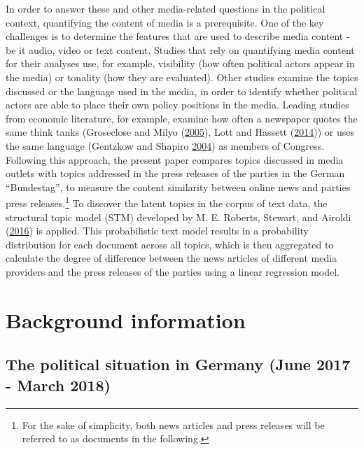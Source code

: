 \documentclass[
]{article}
\begin{document}
In order to answer these and other media-related questions in the
political context, quantifying the content of media is a prerequisite.
One of the key challenges is to determine the features that are used to
describe media content - be it audio, video or text content. Studies
that rely on quantifying media content for their analyses use, for
example, visibility (how often political actors appear in the media) or
tonality (how they are evaluated). Other studies examine the topics
discussed or the language used in the media, in order to identify
whether political actors are able to place their own policy positions in
the media. Leading studies from economic literature, for example,
examine how often a newspaper quotes the same think tanks (Groseclose
and Milyo (\protect\hyperlink{ref-groseclose_measure_2005}{2005}), Lott
and Hassett (\protect\hyperlink{ref-lott_is_2014}{2014})) or uses the
same language (Gentzkow and Shapiro
\protect\hyperlink{ref-gentzkow_media_2004}{2004}) as members of
Congress. Following this approach, the present paper compares topics
discussed in media outlets with topics addressed in the press releases
of the parties in the German ``Bundestag'', to measure the content
similarity between online news and parties press releases.\footnote{For
  the sake of simplicity, both news articles and press releases will be
  referred to as documents in the following.} To discover the latent
topics in the corpus of text data, the structural topic model (STM)
developed by M. E. Roberts, Stewart, and Airoldi
(\protect\hyperlink{ref-roberts_model_2016}{2016}) is applied. This
probabilistic text model results in a probability distribution for each
document across all topics, which is then aggregated to calculate the
degree of difference between the news articles of different media
providers and the press releases of the parties using a linear
regression model.

\hypertarget{background-information}{%
\section{Background information}\label{background-information}}

\hypertarget{the-political-situation-in-germany-june-2017---march-2018}{%
\subsection{The political situation in Germany (June 2017 - March
2018)}\label{the-political-situation-in-germany-june-2017---march-2018}}
\end{document}
